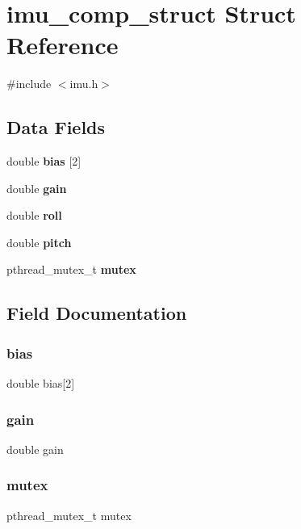 \section{imu\+\_\+comp\+\_\+struct Struct Reference}
\label{structimu__comp__struct}


{\ttfamily \#include $<$imu.\+h$>$}

\subsection*{Data Fields}
\begin{DoxyCompactItemize}
\item 
double \textbf{ bias} [2]
\item 
double \textbf{ gain}
\item 
double \textbf{ roll}
\item 
double \textbf{ pitch}
\item 
pthread\+\_\+mutex\+\_\+t \textbf{ mutex}
\end{DoxyCompactItemize}


\subsection{Field Documentation}
\mbox{\label{structimu__comp__struct_a15d202410d5565852ce6568768b6bbd6}} 
\subsubsection{bias}
{\footnotesize\ttfamily double bias[2]}

\mbox{\label{structimu__comp__struct_ac7b389a0254ed87600f959a5f6d58ab0}} 
\subsubsection{gain}
{\footnotesize\ttfamily double gain}

\mbox{\label{structimu__comp__struct_a4acff8232e4aec9cd5c6dc200ac55ef3}} 
\subsubsection{mutex}
{\footnotesize\ttfamily pthread\+\_\+mutex\+\_\+t mutex}

